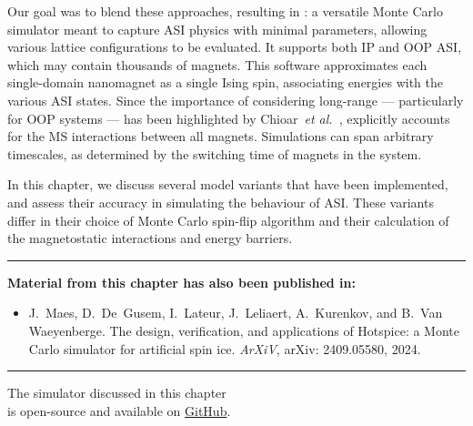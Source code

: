 Our goal was to blend these approaches, resulting in \hotspice: a versatile Monte Carlo simulator meant to capture ASI physics with minimal parameters, allowing various lattice configurations to be evaluated.
It supports both IP and OOP ASI, which may contain thousands of magnets. 
This software approximates each single-domain nanomagnet as a single Ising spin, associating energies with the various ASI states.
Since the importance of considering long-range  --- particularly for OOP systems --- has been highlighted by Chioar~\textit{et al.}~\cite{Chioar2014}, \hotspice{} explicitly accounts for the MS interactions between all magnets.
Simulations can span arbitrary timescales, as determined by the switching time of magnets in the system. \\\par

In this chapter, we discuss several model variants that have been implemented, and assess their accuracy in simulating the behaviour of ASI.
These variants differ in their choice of Monte Carlo spin-flip algorithm and their calculation of the magnetostatic interactions and energy barriers.

\begin{adjustwidth}{2em}{2em} %
	\vspace{0em}
	\begin{center}
		\centering\rule{0.7\linewidth}{0.4pt}
	\end{center}
	\vspace{0em}
	\begin{center}
		\textbf{Material from this chapter has also been published in:} \\
	\end{center}
	\vspace{0em}
	\begin{adjustwidth}{0em}{1.5em}
		\begin{itemize}
			\item[\cite{MAES-24}] J.~Maes, D.~De~Gusem, I.~Lateur, J.~Leliaert, A.~Kurenkov, and B.~Van Waeyenberge.
			\newblock The design, verification, and applications of Hotspice: a Monte Carlo simulator for artificial spin ice.
			\newblock \emph{ArXiV}, arXiv: 2409.05580, 2024.
		\end{itemize}
	\end{adjustwidth}
	\vspace{-0.5em}
	\begin{center}
		\centering\rule{0.7\linewidth}{0.4pt}
	\end{center}
	\vspace{-1em}
	\begin{center}
		The \hotspice simulator discussed in this chapter\\
		is open-source and available on \href{https://github.com/bvwaeyen/Hotspice}{GitHub}.
	\end{center}
\end{adjustwidth}

